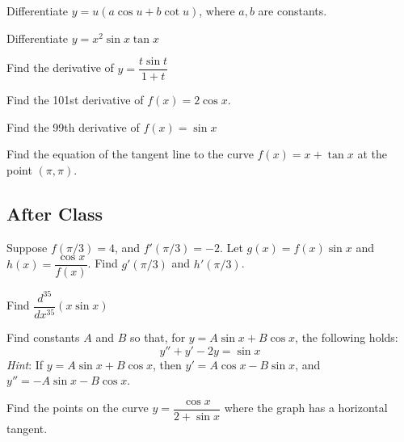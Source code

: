 \documentclass[notes]{subfiles}
\begin{document}
		\begin{ex}
			Differentiate $y = u(a\cos u + b\cot u)$, where $a,b$ are constants.
		\end{ex}
			
		\begin{ex}
			Differentiate $y = x^2\sin x\tan x$
		\end{ex}	
		
		\begin{ex}
			Find the derivative of $y = \dfrac{t\sin t}{1+t}$
		\end{ex}	
			\newpage
			
		\begin{ex}
			Find the 101st derivative of $f(x) = 2\cos x$.
		\end{ex}
		
		\begin{ex}
			Find the 99th derivative of $f(x) = \sin x$
		\end{ex}	
			
		\begin{ex}
			Find the equation of the tangent line to the curve $f(x) = x+\tan x$ at the point $(\pi,\pi)$.  
		\end{ex}	
			\newpage
			
	\subsection*{After Class}
		\begin{ex}
			Suppose $f(\pi/3) = 4$, and $f'(\pi/3) = -2$.  Let $g(x) = f(x)\sin x$ and $h(x) = \dfrac{\cos x}{f(x)}$.  Find $g'(\pi/3)$ and $h'(\pi/3)$.
		\end{ex}
			
		\begin{ex}
			Find $\dfrac{d^{35}}{dx^{35}} (x\sin x)$
		\end{ex}
			\newpage
				
		\begin{ex}
			Find constants $A$ and $B$ so that, for $y = A\sin x + B\cos x$, the following holds:
				\[y'' + y' - 2y = \sin x\]
			\emph{Hint}: If $y = A\sin x + B\cos x$, then $y' = A\cos x - B\sin x$, and $y'' = -A\sin x - B\cos x$.  
		\end{ex}
			
		\begin{ex}
			Find the points on the curve $y = \dfrac{\cos x}{2 + \sin x}$ where the graph has a horizontal tangent.
		\end{ex}

	\clearpage
\end{document}
